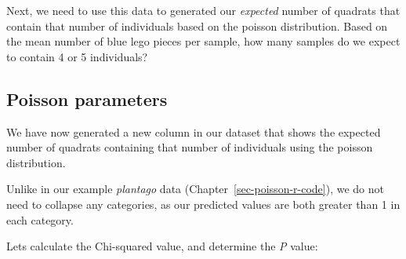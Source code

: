 \documentclass[
  letterpaper,
  DIV=11,
  numbers=noendperiod]{scrreprt}
\newenvironment{Shaded}{\begin{snugshade}}{\end{snugshade}}
\newcommand{\AttributeTok}[1]{\textcolor[rgb]{0.40,0.45,0.13}{#1}}
\newcommand{\CommentTok}[1]{\textcolor[rgb]{0.37,0.37,0.37}{#1}}
\newcommand{\FunctionTok}[1]{\textcolor[rgb]{0.28,0.35,0.67}{#1}}
\newcommand{\NormalTok}[1]{\textcolor[rgb]{0.00,0.23,0.31}{#1}}
\newcommand{\OtherTok}[1]{\textcolor[rgb]{0.00,0.23,0.31}{#1}}
\newcommand{\SpecialCharTok}[1]{\textcolor[rgb]{0.37,0.37,0.37}{#1}}
\begin{document}
Next, we need to use this data to generated our \emph{expected} number
of quadrats that contain that number of individuals based on the poisson
distribution. Based on the mean number of blue lego pieces per sample,
how many samples do we expect to contain 4 or 5 individuals?

\subsection{Poisson parameters}\label{poisson-parameters-1}

\begin{Shaded}
\end{Shaded}

We have now generated a new column in our dataset that shows the
expected number of quadrats containing that number of individuals using
the poisson distribution.

Unlike in our example \emph{plantago} data
(Chapter~\ref{sec-poisson-r-code}), we do not need to collapse any
categories, as our predicted values are both greater than 1 in each
category.

Lets calculate the Chi-squared value, and determine the \emph{P} value:
\end{document}
